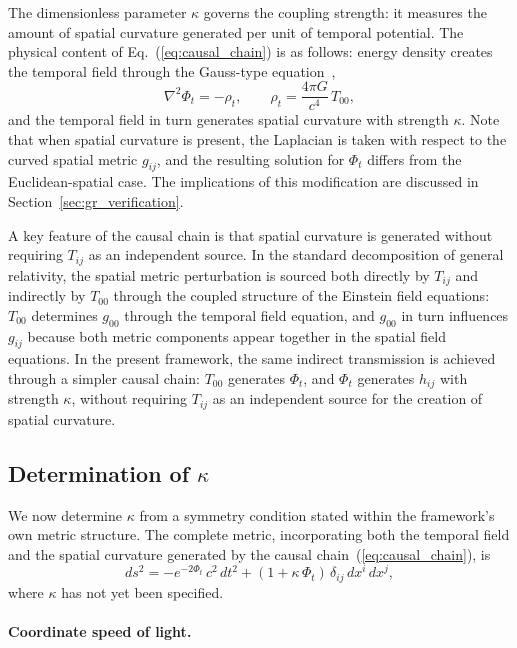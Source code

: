 \documentclass[12pt]{article}
\begin{document}
The dimensionless parameter $\kappa$ governs the coupling strength: it measures the amount of spatial curvature generated per unit of temporal potential. The physical content of Eq.~(\ref{eq:causal_chain}) is as follows: energy density creates the temporal field through the Gauss-type equation~\cite{Gwak2026a},
\begin{equation}
\nabla^2 \Phi_t = -\rho_t, \qquad \rho_t = \frac{4\pi G}{c^4}\,T_{00},
\label{eq:gauss}
\end{equation}
and the temporal field in turn generates spatial curvature with strength $\kappa$. Note that when spatial curvature is present, the Laplacian is taken with respect to the curved spatial metric $g_{ij}$, and the resulting solution for $\Phi_t$ differs from the Euclidean-spatial case. The implications of this modification are discussed in Section~\ref{sec:gr_verification}.

A key feature of the causal chain is that spatial curvature is generated without requiring $T_{ij}$ as an independent source. In the standard decomposition of general relativity, the spatial metric perturbation is sourced both directly by $T_{ij}$ and indirectly by $T_{00}$ through the coupled structure of the Einstein field equations: $T_{00}$ determines $g_{00}$ through the temporal field equation, and $g_{00}$ in turn influences $g_{ij}$ because both metric components appear together in the spatial field equations. In the present framework, the same indirect transmission is achieved through a simpler causal chain: $T_{00}$ generates $\Phi_t$, and $\Phi_t$ generates $h_{ij}$ with strength $\kappa$, without requiring $T_{ij}$ as an independent source for the creation of spatial curvature.

\subsection{Determination of $\kappa$}
\label{sec:kappa}

We now determine $\kappa$ from a symmetry condition stated within the framework's own metric structure. The complete metric, incorporating both the temporal field and the spatial curvature generated by the causal chain~(\ref{eq:causal_chain}), is
\begin{equation}
ds^2 = -e^{-2\Phi_t}\,c^2\,dt^2 + (1 + \kappa\,\Phi_t)\,\delta_{ij}\,dx^i\,dx^j,
\end{equation}
where $\kappa$ has not yet been specified.

\paragraph{Coordinate speed of light.}
\end{document}
